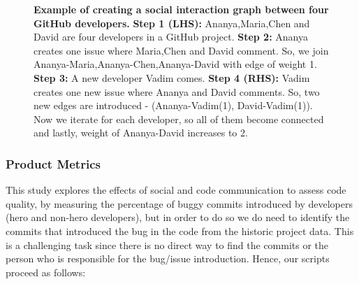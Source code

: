 \documentclass[smallextended]{svjour3}
\begin{document}
\begin{figure}
\begin{tikzpicture}
    \end{tikzpicture}
\caption{\textbf{Example of creating a social interaction graph between four GitHub developers.}
\textbf{Step 1 (LHS):} Ananya,Maria,Chen and David are four developers in a GitHub project. \textbf{Step 2:} Ananya creates one issue where Maria,Chen and David comment. So, we join Ananya-Maria,Ananya-Chen,Ananya-David with edge of weight 1. \textbf{Step 3:} A new developer Vadim comes. \textbf{Step 4 (RHS):} Vadim creates one new issue where Ananya and David comments. So, two new edges are introduced - (Ananya-Vadim(1), David-Vadim(1)).  Now we iterate for each developer, so all of them become connected and lastly,  weight of Ananya-David increases to 2.}
\label{fig:social_interaction_graph}       
\end{figure}




\subsubsection{Product Metrics}
\label{sec:Product Merics}
This study explores the effects of social and code communication to assess code quality, by measuring the percentage of buggy commits introduced by developers (hero and non-hero developers),  but in order to do so we do need to identify the commits that introduced the bug in the code from the historic project data. This is   a 
challenging task since there is no direct way to find the commits or the person who is responsible for the bug/issue introduction. Hence,
our scripts proceed as follows:
\end{document}

